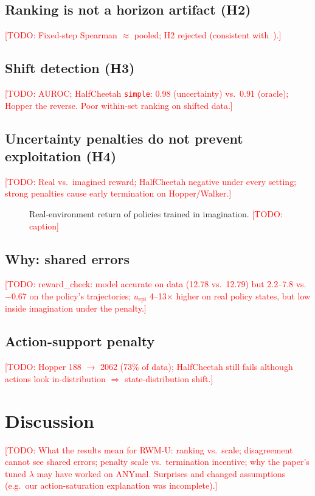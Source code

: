 \documentclass[conference]{IEEEtran}
\newcommand{\todo}[1]{\textcolor{red}{[TODO: #1]}}
\newcommand{\rwmu}{RWM-U}
\newcommand{\uepi}{u_{\text{epi}}}
\begin{document}
\subsection{Ranking is not a horizon artifact (H2)}
\todo{Fixed-step Spearman $\approx$ pooled; H2 rejected (consistent with~\cite{singh2026auditing}).}

\subsection{Shift detection (H3)}
\todo{AUROC; HalfCheetah \texttt{simple}: 0.98 (uncertainty) vs.\ 0.91 (oracle); Hopper the
reverse. Poor within-set ranking on shifted data.}

\subsection{Uncertainty penalties do not prevent exploitation (H4)}
\todo{Real vs.\ imagined reward; HalfCheetah negative under every setting; strong penalties
cause early termination on Hopper/Walker.}

\begin{figure}[t]
\centering
\fbox{\parbox[c][4cm][c]{0.9\linewidth}{\centering \todo{figure: real return vs.\ $\lambda$ per
penalty type, one panel per env; dashed line = dataset return}}}
\caption{Real-environment return of policies trained in imagination. \todo{caption}}
\label{fig:policy}
\end{figure}

\subsection{Why: shared errors}
\todo{reward\_check: model accurate on data (12.78 vs.\ 12.79) but 2.2--7.8 vs.\ $-$0.67 on the
policy's trajectories; $\uepi$ 4--13$\times$ higher on real policy states, but low inside
imagination under the penalty.}

\subsection{Action-support penalty}
\todo{Hopper 188 $\to$ 2062 (73\% of data); HalfCheetah still fails although actions look
in-distribution $\Rightarrow$ state-distribution shift.}

\section{Discussion}
\label{sec:discussion}
\todo{What the results mean for \rwmu{}: ranking vs.\ scale; disagreement cannot see shared
errors; penalty scale vs.\ termination incentive; why the paper's tuned $\lambda$ may have
worked on ANYmal. Surprises and changed assumptions (e.g.\ our action-saturation explanation was
incomplete).}
\end{document}

